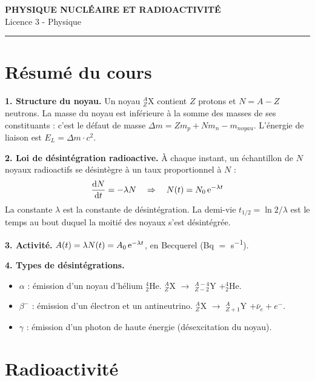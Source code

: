 \documentclass[12pt,a4paper]{article}
\begin{document}
\fi

\begin{center}
  {\LARGE\bfseries PHYSIQUE NUCLÉAIRE ET RADIOACTIVITÉ}\\[0.3cm]
  {\normalsize Licence 3 - Physique}\\[0.1cm]
  \rule{0.7\textwidth}{0.8pt}
\end{center}

\section*{Résumé du cours}

\begin{boiteresume}

\textbf{1. Structure du noyau.} Un noyau ${}^A_Z$X contient $Z$ protons et $N = A-Z$ neutrons. La masse du noyau est inférieure à la somme des masses de ses constituants : c'est le défaut de masse $\Delta m = Zm_p + Nm_n - m_{noyau}$. L'énergie de liaison est $E_L = \Delta m\cdot c^2$.

\textbf{2. Loi de désintégration radioactive.} À chaque instant, un échantillon de $N$ noyaux radioactifs se désintègre à un taux proportionnel à $N$ :
\[
\frac{\mathrm{d} N}{\mathrm{d} t} = -\lambda N \quad \Rightarrow \quad N(t) = N_0\,\mathrm{e}^{-\lambda t}
\]
La constante $\lambda$ est la constante de désintégration. La demi-vie $t_{1/2} = \ln 2/\lambda$ est le temps au bout duquel la moitié des noyaux s'est désintégrée.

\textbf{3. Activité.} $A(t) = \lambda N(t) = A_0\,\mathrm{e}^{-\lambda t}$, en Becquerel (Bq $=$ \unit{s^{-1}}).

\textbf{4. Types de désintégrations.}
\begin{itemize}[nosep]
  \item $\alpha$ : émission d'un noyau d'hélium ${}^4_2$He. ${}^A_Z$X $\to$ ${}^{A-4}_{Z-2}$Y $+ {}^4_2$He.
  \item $\beta^-$ : émission d'un électron et un antineutrino. ${}^A_Z$X $\to$ ${}^A_{Z+1}$Y $+ \bar{\nu}_e + e^-$.
  \item $\gamma$ : émission d'un photon de haute énergie (désexcitation du noyau).
\end{itemize}

\end{boiteresume}

\newpage
\section{Radioactivité}
\end{document}
